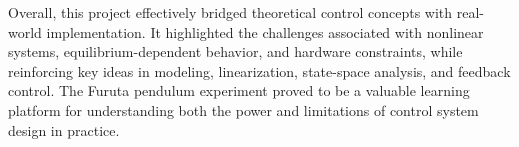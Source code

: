 \documentclass[12pt,a4paper]{article}
\begin{document}
Overall, this project effectively bridged theoretical control concepts with real-world implementation. It highlighted the challenges associated with nonlinear systems, equilibrium-dependent behavior, and hardware constraints, while reinforcing key ideas in modeling, linearization, state-space analysis, and feedback control. The Furuta pendulum experiment proved to be a valuable learning platform for understanding both the power and limitations of control system design in practice.
\end{document}

